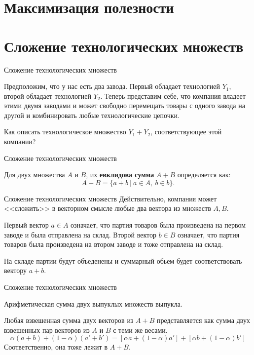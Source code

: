 \documentclass{beamer}
\begin{document}
\section{Максимизация полезности}

\section{Сложение технологических множеств}

\begin{frame}{Сложение технологических множеств}

Предположим, что у нас есть два завода. Первый обладает технологией $Y_1$, второй обладает технологией $Y_2$. Теперь представим себе, что компания владеет этими двумя заводами и может свободно перемещать товары с одного завода на другой и комбинировать любые технологические цепочки. 

Как описать технологическое множество $Y_1 + Y_2$, соответствующее этой компании?

\end{frame}

\begin{frame}{Сложение технологических множеств}

\begin{definition}
Для двух множества $A$ и $B$, их \textbf{евклидова сумма} $A+B$ определяется как:
$$ A+B = \{a + b \ | \ a \in A, \ b \in b\}.$$
\end{definition}
\end{frame}

\begin{frame}{Сложение технологических множеств}
Действительно, компания может <<сложить>> в векторном смысле любые два вектора из множеств $A, B$. 

Первый вектор $a \in A$ означает, что партия товаров была произведена на первом заводе и была отправлена на склад. Второй вектор $b \in B$ означает, что партия товаров была произведена на втором заводе и тоже отправлена на склад. 

На складе партии будут объеденены и суммарный обьем будет соответствовать вектору $a + b$.
\end{frame}

\begin{frame}{Сложение технологических множеств}
\begin{lemma}
Арифметическая сумма двух выпуклых множеств выпукла.
\end{lemma}
Любая взвешенная сумма двух векторов из $A+B$ представляется как сумма двух взвешенных пар векторов из $A$ и $B$ с теми же весами.
$$ \alpha(a + b) + (1-\alpha)(a'+b') = [\alpha a + (1-\alpha) a'] + [\alpha b + (1-\alpha) b']$$
Соответственно, она тоже лежит в $A + B$.
\end{frame}
\end{document}
